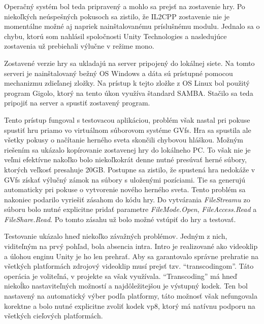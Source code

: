 \documentclass[slovak, bachelorpractice]{diploma}
\begin{document}
Operačný systém bol teda pripravený a mohlo sa prejsť na zostavenie hry. Po niekoľkých neúspešných pokusoch sa zistilo, že IL2CPP zostavenie nie je momentálne možné aj napriek nainštalovanému príslušnému modulu. Jednalo sa o chybu, ktorú som nahlásil spoločnosti Unity Technologies a nasledujúce zostavenia už prebiehali výlučne v režime mono. 

Zostavené verzie hry sa ukladajú na server pripojený do lokálnej siete. Na tomto serveri je nainštalovaný bežný OS Windows a dáta sú prístupné pomocou mechanizmu zdieľanej zložky. Na prístup k tejto zložke z OS Linux bol použitý program Gigolo, ktorý na tento úkon využíva štandard SAMBA. Stačilo sa teda pripojiť na server a spustiť zostavený program.

Tento prístup fungoval s testovacou aplikáciou, problém však nastal pri pokuse spustiť hru priamo vo virtuálnom súborovom systéme GVfs. Hra sa spustila ale všetky pokusy o načítanie herného sveta skončili chybovou hláškou. Možným riešením sa ukázalo kopírovanie zostavenej hry do lokálneho PC. To však nie je veľmi efektívne nakoľko bolo niekoľkokrát denne nutné presúvať herné súbory, ktorých veľkosť presahuje 20GB. Postupne sa zistilo, že spustená hra nedokáže v GVfs získať výlučný zámok na súbory s uloženými pozíciami. Tie sa generujú automaticky pri pokuse o vytvorenie nového herného sveta. Tento problém sa nakoniec podarilo vyriešiť zásahom do kódu hry. Do vytvárania \textit{FileStreamu} zo súboru bolo nutné explicitne pridať parametre \textit{FileMode.Open}, \textit{FileAccess.Read} a \textit{FileShare.Read}. Po tomto zásahu už bolo možné vstúpiť do hry a testovať.

Testovanie ukázalo hneď niekoľko závažných problémov. Jedným z nich, viditeľným na prvý pohľad, bola absencia intra. Intro je realizované ako videoklip a úlohou enginu Unity je ho len prehrať. Aby sa garantovalo správne prehratie na všetkých platformách zdrojový videoklip musí prejsť tzv. \enquote{transcodingom}. Táto operácia je voliteľná, v projekte sa však využívala. \enquote{Transcoding} má hneď niekoĺko nastaviteľných možností a najdôležitejšou je výstupný kodek. Ten bol nastavený na automatický výber podľa platformy, táto možnosť však nefungovala korektne a bolo nutné explicitne zvoliť kodek vp8, ktorý má natívnu podporu na všetkých cieľových platformách.
\end{document}
